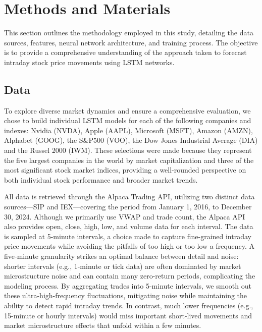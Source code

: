 \documentclass[letterpaper]{article}
\begin{document}
\section{Methods and Materials}
This section outlines the methodology employed in this study, detailing the data sources, features, neural network architecture, and training process. The objective is to provide a comprehensive understanding of the approach taken to forecast intraday stock price movements using LSTM networks.

\subsection{Data}

To explore diverse market dynamics and ensure a comprehensive evaluation, we chose to build individual LSTM models for each of the following companies and indexes: Nvidia (NVDA), Apple (AAPL), Microsoft (MSFT), Amazon (AMZN), Alphabet (GOOG), the S\&P500 (VOO), the Dow Jones Industrial Average (DIA) and the Russel 2000 (IWM). These selections were made because they represent the five largest companies in the world by market capitalization and three of the most significant stock market indices, providing a well-rounded perspective on both individual stock performance and broader market trends. 

All data is retrieved through the Alpaca Trading API\cite{alpaca_api}, utilizing two distinct data sources—SIP and IEX—covering the period from January 1, 2016, to December 30, 2024. Although we primarily use VWAP and trade count, the Alpaca API also provides open, close, high, low, and volume data for each interval. The data is sampled at 5-minute intervals, a choice made to capture fine-grained intraday price movements while avoiding the pitfalls of too high or too low a frequency.
A five-minute granularity strikes an optimal balance between detail and noise: shorter intervals (e.g., 1-minute or tick data) are often dominated by market microstructure noise and can contain many zero-return periods, complicating the modeling process. By aggregating trades into 5-minute intervals, we smooth out these ultra-high-frequency fluctuations, mitigating noise while maintaining the ability to detect rapid intraday trends. In contrast, much lower frequencies (e.g., 15-minute or hourly intervals) would miss important short-lived movements and market microstructure effects that unfold within a few minutes.
\end{document}
